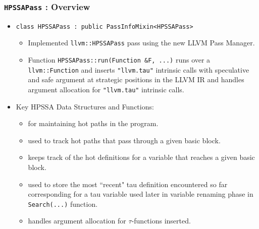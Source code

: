 \documentclass[aspectratio=169, compress]{beamer}
\begin{document}
\begin{frame}
	\frametitle{\texttt{HPSSAPass} : Overview}
	\begin{itemize}
		\item \texttt{class HPSSAPass : public PassInfoMixin<HPSSAPass>}
		\begin{itemize}
			\footnotesize
			\item Implemented \texttt{llvm::HPSSAPass} pass using the new LLVM Pass Manager. 
			\item Function \texttt{HPSSAPass::run(Function &F, ...)}  runs over a \texttt{llvm::Function} and inserts \texttt{"llvm.tau"} intrinsic calls with speculative and safe argument at strategic positions in the LLVM IR and handles argument allocation for \texttt{"llvm.tau"} intrinsic calls. \pause
		\end{itemize}
		\item Key HPSSA Data Structures and Functions:  \pause
		\begin{itemize}
			\footnotesize
			\item {} \pause for maintaining \color{red} hot paths \color{black} in the program. \pause
			\item {} \pause used to track \color{red} hot paths \color{black} that pass through a given basic block. \pause
			\item {} \pause keeps track of the \color{red} hot \color{black} definitions for a variable that reaches a given basic block. \pause
			\item {} \pause used to store the most ``recent" tau definition encountered so far corresponding for a tau variable used later in variable renaming phase in \texttt{Search(...)} function. \pause
			\item {} \pause handles argument allocation for $\tau$-functions inserted.
		\end{itemize}
	\end{itemize}
\end{frame}
\end{document}
